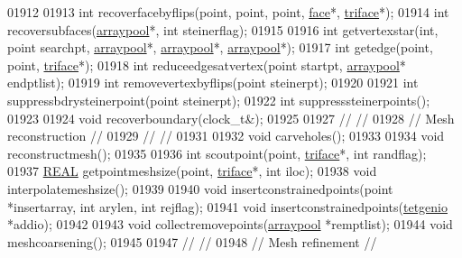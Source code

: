 \begin{DoxyCode}
01912 
01913   \textcolor{keywordtype}{int} recoverfacebyflips(point, point, point, \hyperlink{classtetgenmesh_1_1face}{face}*, \hyperlink{classtetgenmesh_1_1triface}{triface}*);
01914   \textcolor{keywordtype}{int} recoversubfaces(\hyperlink{classtetgenmesh_1_1arraypool}{arraypool}*, \textcolor{keywordtype}{int} steinerflag);
01915 
01916   \textcolor{keywordtype}{int} getvertexstar(\textcolor{keywordtype}{int}, point searchpt, \hyperlink{classtetgenmesh_1_1arraypool}{arraypool}*, \hyperlink{classtetgenmesh_1_1arraypool}{arraypool}*, 
      \hyperlink{classtetgenmesh_1_1arraypool}{arraypool}*);
01917   \textcolor{keywordtype}{int} getedge(point, point, \hyperlink{classtetgenmesh_1_1triface}{triface}*);
01918   \textcolor{keywordtype}{int} reduceedgesatvertex(point startpt, \hyperlink{classtetgenmesh_1_1arraypool}{arraypool}* endptlist);
01919   \textcolor{keywordtype}{int} removevertexbyflips(point steinerpt);
01920 
01921   \textcolor{keywordtype}{int} suppressbdrysteinerpoint(point steinerpt);
01922   \textcolor{keywordtype}{int} suppresssteinerpoints();
01923 
01924   \textcolor{keywordtype}{void} recoverboundary(clock\_t&);
01925 
01927 \textcolor{comment}{//                                                                           //}
01928 \textcolor{comment}{// Mesh reconstruction                                                       //}
01929 \textcolor{comment}{//                                                                           //}
01931 \textcolor{comment}{}
01932   \textcolor{keywordtype}{void} carveholes();
01933 
01934   \textcolor{keywordtype}{void} reconstructmesh();
01935 
01936   \textcolor{keywordtype}{int}  scoutpoint(point, \hyperlink{classtetgenmesh_1_1triface}{triface}*, \textcolor{keywordtype}{int} randflag);
01937   \hyperlink{tetgen_8h_a4b654506f18b8bfd61ad2a29a7e38c25}{REAL} getpointmeshsize(point, \hyperlink{classtetgenmesh_1_1triface}{triface}*, \textcolor{keywordtype}{int} iloc);
01938   \textcolor{keywordtype}{void} interpolatemeshsize();
01939 
01940   \textcolor{keywordtype}{void} insertconstrainedpoints(point *insertarray, \textcolor{keywordtype}{int} arylen, \textcolor{keywordtype}{int} rejflag);
01941   \textcolor{keywordtype}{void} insertconstrainedpoints(\hyperlink{classtetgenio}{tetgenio} *addio);
01942 
01943   \textcolor{keywordtype}{void} collectremovepoints(\hyperlink{classtetgenmesh_1_1arraypool}{arraypool} *remptlist);
01944   \textcolor{keywordtype}{void} meshcoarsening();
01945 
01947 \textcolor{comment}{//                                                                           //}
01948 \textcolor{comment}{// Mesh refinement                                                           //}

\end{DoxyCode}
